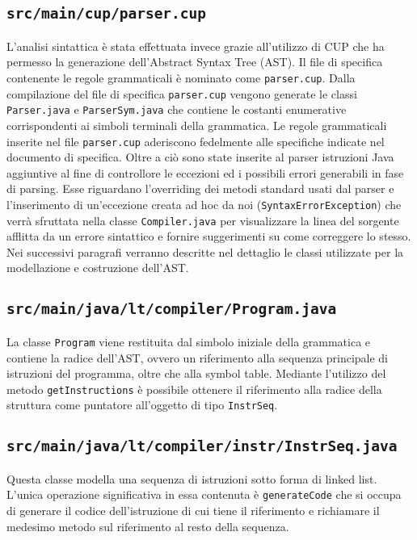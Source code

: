 \documentclass[10pt,a4paper]{article}
\begin{document}
\subsection{\texttt{src/main/cup/parser.cup}}
L'analisi sintattica è stata effettuata invece grazie all'utilizzo di CUP che ha permesso la generazione dell'Abstract Syntax Tree (AST). Il file di specifica contenente le regole grammaticali è nominato come \texttt{parser.cup}. Dalla compilazione del file di specifica \texttt{parser.cup} vengono generate le classi \texttt{Parser.java} e \texttt{ParserSym.java} che contiene le costanti enumerative corrispondenti ai simboli terminali della grammatica.
Le regole grammaticali inserite nel file \texttt{parser.cup} aderiscono fedelmente alle specifiche indicate nel documento di specifica. Oltre a ciò sono state inserite al parser istruzioni Java aggiuntive al fine di controllore le eccezioni ed i possibili errori generabili in fase di parsing.
Esse riguardano l'overriding dei metodi standard usati dal parser e l'inserimento di un'eccezione creata ad hoc da noi (\texttt{SyntaxErrorException}) che verrà sfruttata nella classe \texttt{Compiler.java} per visualizzare la linea del sorgente afflitta da un errore sintattico e fornire suggerimenti su come correggere lo stesso. Nei successivi paragrafi verranno descritte nel dettaglio le classi utilizzate per la modellazione e costruzione dell'AST.

\subsection{\texttt{src/main/java/lt/compiler/Program.java}}
La classe \texttt{Program} viene restituita dal simbolo iniziale della grammatica e contiene la radice dell'AST, ovvero un riferimento alla sequenza principale di istruzioni del programma, oltre che alla symbol table. Mediante l'utilizzo del metodo \texttt{getInstructions} è possibile ottenere il riferimento alla radice della struttura come puntatore all'oggetto di tipo \texttt{InstrSeq}.

\subsection{\texttt{src/main/java/lt/compiler/instr/InstrSeq.java}}
Questa classe modella una sequenza di istruzioni sotto forma di linked list. L'unica operazione significativa in essa contenuta è \texttt{generateCode} che si occupa di generare il codice dell'istruzione di cui tiene il riferimento e richiamare il medesimo metodo sul riferimento al resto della sequenza.
\end{document}
